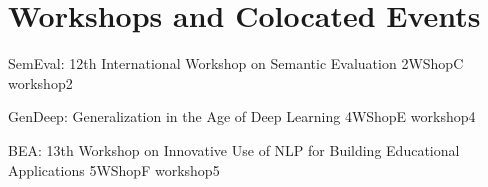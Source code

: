 \chapter[Workshops and Colocated Events: \daydate]{Workshops and Colocated Events}
\thispagestyle{emptyheader}
\vfill







\begin{wsschedule}
  {SemEval: 12th International Workshop on Semantic Evaluation}
  {2}{WShopC}
  {workshop2}
  {\WShopLocC}
  
\end{wsschedule}




\begin{wsschedule}
  {GenDeep: Generalization in the Age of Deep Learning}
  {4}{WShopE}
  {workshop4}
  {\WShopLocE}
  
\end{wsschedule}

\begin{wsschedule}
  {BEA: 13th Workshop on Innovative Use of NLP for Building Educational Applications}
  {5}{WShopF}
  {workshop5}
  {\WShopLocF}
  
\end{wsschedule}

